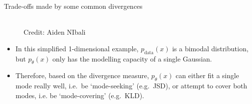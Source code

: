 %


\begin{frame} {Trade-offs made by some common divergences}

  \begin{figure}
    \centering
      \tiny{\\Credit: Aiden NIbali}
  \end{figure}
  \begin{itemize}
    \item In this simplified 1-dimensional example, $p_{\text{data}}(x)$ is a bimodal distribution, but $p_{\theta}(x)$ only has the modelling capacity of a single Gaussian.
    \vspace{2mm}
    \item Therefore, based on the divergence measure, $p_{\theta}(x)$ can either fit a single mode really well, i.e.~be `mode-seeking' (e.g.~JSD), or attempt to cover both modes, i.e. be `mode-covering' (e.g.~KLD).
  \end{itemize}
\end{frame}


